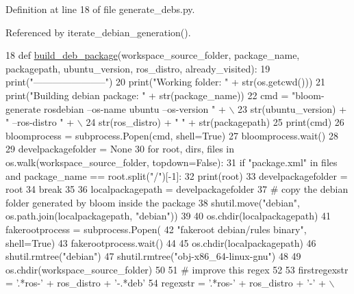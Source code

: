 Definition at line 18 of file generate\+\_\+debs.\+py.



Referenced by iterate\+\_\+debian\+\_\+generation().


\begin{DoxyCode}
18 \textcolor{keyword}{def }\hyperlink{namespacegenerate__debs_aa70c3f4917ddc57b13eaed8501f571a8}{build\_deb\_package}(workspace\_source\_folder, package\_name, packagepath, ubuntu\_version, 
      ros\_distro, already\_visited):
19     print(\textcolor{stringliteral}{"-----------------------"})
20     print(\textcolor{stringliteral}{"Working folder: "} + str(os.getcwd()))
21     print(\textcolor{stringliteral}{"Building debian package: "} + str(package\_name))
22     cmd = \textcolor{stringliteral}{"bloom-generate rosdebian --os-name ubuntu --os-version "} + \(\backslash\)
23         str(ubuntu\_version) + \textcolor{stringliteral}{" --ros-distro "} + \(\backslash\)
24         str(ros\_distro) + \textcolor{stringliteral}{" "} + str(packagepath)
25     print(cmd)
26     bloomprocess = subprocess.Popen(cmd, shell=\textcolor{keyword}{True})
27     bloomprocess.wait()
28 
29     develpackagefolder = \textcolor{keywordtype}{None}
30     \textcolor{keywordflow}{for} root, dirs, files \textcolor{keywordflow}{in} os.walk(workspace\_source\_folder, topdown=\textcolor{keyword}{False}):
31         \textcolor{keywordflow}{if} \textcolor{stringliteral}{"package.xml"} \textcolor{keywordflow}{in} files \textcolor{keywordflow}{and} package\_name == root.split(\textcolor{stringliteral}{"/"})[-1]:
32             print(root)
33             develpackagefolder = root
34             \textcolor{keywordflow}{break}
35 
36     localpackagepath = develpackagefolder
37     \textcolor{comment}{# copy the debian folder generated by bloom inside the package}
38     shutil.move(\textcolor{stringliteral}{"debian"}, os.path.join(localpackagepath, \textcolor{stringliteral}{"debian"}))
39 
40     os.chdir(localpackagepath)
41     fakerootprocess = subprocess.Popen(
42         \textcolor{stringliteral}{"fakeroot debian/rules binary"}, shell=\textcolor{keyword}{True})
43     fakerootprocess.wait()
44 
45     os.chdir(localpackagepath)
46     shutil.rmtree(\textcolor{stringliteral}{"debian"})
47     shutil.rmtree(\textcolor{stringliteral}{"obj-x86\_64-linux-gnu"})
48 
49     os.chdir(workspace\_source\_folder)
50 
51     \textcolor{comment}{# improve this regex}
52 
53     firstregexstr = \textcolor{stringliteral}{'.*ros-'} + ros\_distro + \textcolor{stringliteral}{'-.*deb'}
54     regexstr = \textcolor{stringliteral}{'.*ros-'} + ros\_distro + \textcolor{stringliteral}{'-'} + \(\backslash\)

\end{DoxyCode}
